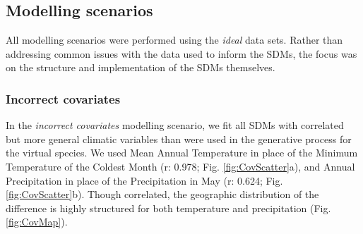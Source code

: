 \documentclass[]{article}
\begin{document}
\subsection{Modelling scenarios}

All modelling scenarios were performed using the \emph{ideal} data sets.
Rather than addressing common issues with the data used to inform the
SDMs, the focus was on the structure and implementation of the SDMs
themselves.

\subsubsection{Incorrect covariates}

In the \emph{incorrect covariates} modelling scenario, we fit all SDMs
with correlated but more general climatic variables than were used in
the generative process for the virtual species. We used Mean Annual
Temperature in place of the Minimum Temperature of the Coldest Month (r:
0.978; Fig. \ref{fig:CovScatter}a), and Annual Precipitation in place of
the Precipitation in May (r: 0.624; Fig. \ref{fig:CovScatter}b). Though
correlated, the geographic distribution of the difference is highly
structured for both temperature and precipitation (Fig.
\ref{fig:CovMap}).
\end{document}
